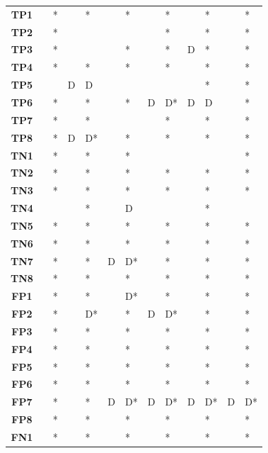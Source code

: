\begin{table}
\begin{tabularx}{\textwidth}{ c YYYYYYYYYYYY}
        \textbf{TP1} &  & * &  & * &  & * &  & * &  & * &  & * \\
        \textbf{TP2} &  & * &  &  &  &  &  & * &  & * &  & * \\
        \textbf{TP3} &  & * &  &  &  & * &  & * & D & * &  & * \\
        \textbf{TP4} &  & * &  & * &  & * &  & * &  & * &  & * \\
        \textbf{TP5} &  &  & D & D &  &  &  &  &  & * &  & * \\
        \textbf{TP6} &  & * &  & * &  & * & D & D* & D & D &  & * \\
        \textbf{TP7} &  & * &  & * &  &  &  & * &  & * &  & * \\
        \textbf{TP8} &  & * & D & D* &  & * &  & * &  & * &  & * \\
        \textbf{TN1} &  & * &  & * &  & * &  &  &  &  &  & * \\
        \textbf{TN2} &  & * &  & * &  & * &  & * &  & * &  & * \\
        \textbf{TN3} &  & * &  & * &  & * &  & * &  & * &  & * \\
        \textbf{TN4} &  &  &  & * &  & D &  &  &  & * &  &  \\
        \textbf{TN5} &  & * &  & * &  & * &  & * &  & * &  & * \\
        \textbf{TN6} &  & * &  & * &  & * &  & * &  & * &  & * \\
        \textbf{TN7} &  & * &  & * & D & D* &  & * &  & * &  & * \\
        \textbf{TN8} &  & * &  & * &  & * &  & * &  & * &  & * \\
        \textbf{FP1} &  & * &  & * &  & D* &  & * &  & * &  & * \\
        \textbf{FP2} &  & * &  & D* &  & * & D & D* &  & * &  & * \\
        \textbf{FP3} &  & * &  & * &  & * &  & * &  & * &  & * \\
        \textbf{FP4} &  & * &  & * &  & * &  & * &  & * &  & * \\
        \textbf{FP5} &  & * &  & * &  & * &  & * &  & * &  & * \\
        \textbf{FP6} &  & * &  & * &  & * &  & * &  & * &  & * \\
        \textbf{FP7} &  & * &  & * & D & D* & D & D* & D & D* & D & D* \\
        \textbf{FP8} &  & * &  & * &  & * &  & * &  & * &  & * \\
        \textbf{FN1} &  & * &  & * &  & * &  & * &  & * &  & * \\

\end{tabularx}
\end{table}

